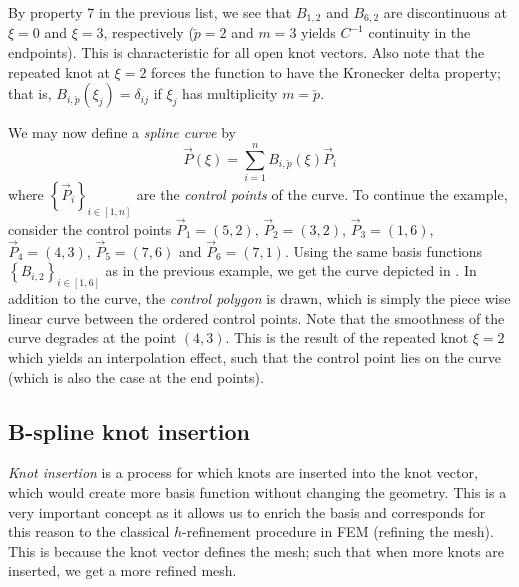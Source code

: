 By property 7 in the previous list, we see that $B_{1,2}$ and $B_{6,2}$ are discontinuous at $\xi = 0$ and $\xi = 3$, respectively ($\check{p}=2$ and $m=3$ yields $C^{-1}$ continuity in the endpoints). This is characteristic for all open knot vectors. Also note that the repeated knot at $\xi = 2$ forces the function to have the Kronecker delta property; that is, $B_{i,\check{p}}(\xi_j) = \delta_{ij}$ if $\xi_j$ has multiplicity $m=\check{p}$.

We may now define a \textit{spline curve} by
\begin{equation*}
	\vec{P}(\xi) = \sum_{i=1}^n B_{i,\check{p}}(\xi) \vec{P}_i
\end{equation*}
where $\left\{\vec{P}_i\right\}_{i\in[1,n]}$ are the \textit{control points} of the curve. To continue the example, consider the control points $\vec{P}_1=(5,2)$, $\vec{P}_2=(3,2)$, $\vec{P}_3=(1,6)$, $\vec{P}_4=(4,3)$, $\vec{P}_5=(7,6)$ and $\vec{P}_6=(7,1)$. Using the same basis functions $\left\{B_{i,2}\right\}_{i\in[1,6]}$ as in the previous example, we get the curve depicted in . In addition to the curve, the \textit{control polygon} is drawn, which is simply the piece wise linear curve between the ordered control points. Note that the smoothness of the curve degrades at the point $(4,3)$. This is the result of the repeated knot $\xi = 2$ which yields an interpolation effect, such that the control point lies on the curve (which is also the case at the end points).

\subsection{B-spline knot insertion}
\textit{Knot insertion} is a process for which knots are inserted into the knot vector, which would create more basis function without changing the geometry. This is a very important concept as it allows us to enrich the basis and corresponds for this reason to the classical $h$-refinement procedure in FEM (refining the mesh). This is because the knot vector defines the mesh; such that when more knots are inserted, we get a more refined mesh.

